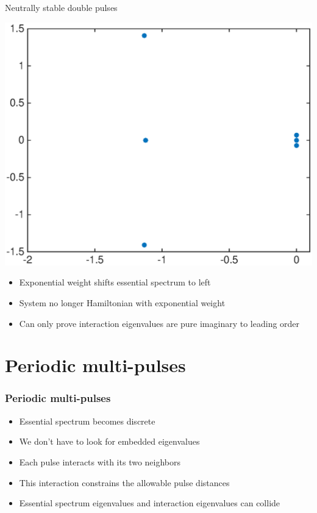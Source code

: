 \documentclass[16pt]{beamer}
\begin{document}
\begin{frame}{Neutrally stable double pulses}
	\fontsize{14}{7.2}\selectfont
	\begin{center}
		\includegraphics[width=0.5\linewidth]{images/stableeigweighted2}
	\end{center}
	\begin{itemize}
		\item Exponential weight shifts essential spectrum to left
		\item System no longer Hamiltonian with exponential weight
		\item Can only prove interaction eigenvalues are pure imaginary to leading order 
	\end{itemize}
\end{frame}

\section{Periodic multi-pulses}

\begin{frame}
	\frametitle{Periodic multi-pulses}
	\fontsize{16}{7.2}\selectfont
	\begin{itemize}
		\item Essential spectrum becomes discrete
		\vspace{0.5cm}
		\item We don't have to look for embedded eigenvalues
		\vspace{0.5cm}
		\item Each pulse interacts with its two neighbors
		\vspace{0.5cm}
		\item This interaction constrains the allowable pulse distances
		\vspace{0.5cm}
		\item Essential spectrum eigenvalues and interaction eigenvalues can collide
	\end{itemize}
\end{frame}
\end{document}
